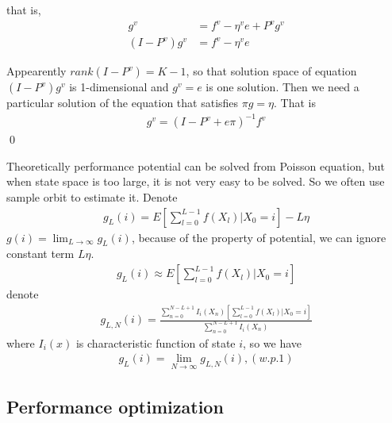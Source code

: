 \documentclass[runningheads]{llncs}
\begin{document}
    that is,
    \begin{align}
        g^v &= f^v - \eta^v e + P^v g^v \\
        (I - P^v)g^v &= f^v - \eta^v e
    \end{align}
    \par
    Appearently $rank (I - P^v) = K - 1$, so that solution space of equation $(I - P^v) g^v$ is 1-dimensional
    and $g^v = e$ is one solution. Then we need a particular solution of the equation that satisfies $\pi g = \eta$.
    That is 
    \begin{align}
        g^v = (I - P^v + e\pi)^{-1}f^v
    \end{align} \qed

    Theoretically performance potential can be solved from Poisson equation,
    but when state space is too large, it is not very easy to be solved.
    So we often use sample orbit to estimate it. Denote
    \begin{align}
        g_L(i) = E[\sum_{l=0}^{L-1}f(X_l)|X_0=i] - L\eta
    \end{align}
    $g(i) = \mathop{\lim}_{L \rightarrow \infty} g_L(i)$, because of the property of potential,
    we can ignore constant term $L\eta$.
    \begin{align}
        g_L(i) \approx E[\sum_{l=0}^{L-1}f(X_l)|X_0=i]
    \end{align}
    denote
    \begin{align}
        g_{L,N}(i) = \frac{\sum_{n=0}^{N-L+1} I_i(X_n) [\sum_{l=0}^{L-1}f(X_l)|X_0=i]}{\sum_{n=0}^{N-L+1} I_i(X_n)}
    \end{align}
    where $I_i(x)$ is characteristic function of state $i$, so we have
    \begin{align}
        g_L(i) = \mathop{\lim}_{N\rightarrow \infty} g_{L,N}(i), (w.p.1)
    \end{align}
    \subsection{Performance optimization}


    
\end{document}
